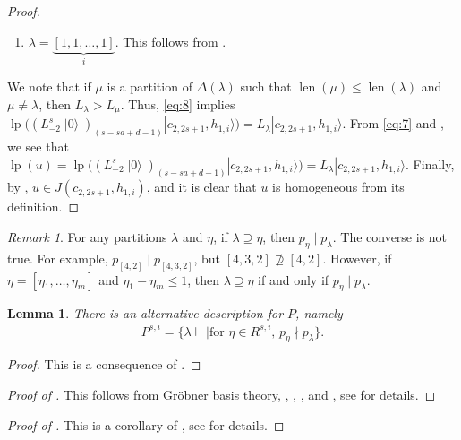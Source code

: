\documentclass[a4paper, 12pt, reqno]{amsart}
\newtheorem{lemma}[theorem]{Lemma}
\theoremstyle{remark}
\newtheorem{remark}[theorem]{Remark}
\DeclareMathOperator{\len}{len}
\DeclareMathOperator{\vac}{|0\rangle}
\DeclareMathOperator{\lp}{lp}
\begin{document}
\begin{proof}
\begin{enumerate}
\begin{description}[leftmargin = !]
      Since $\binom{s - 1}{d - 1} + \binom{s - 1}{d} = \binom{s}{d}$, we obtain \eqref{eq:8}.
    \end{description}
  \item $\lambda = \underbrace{[1, 1, \dots, 1]}_i$.
    This follows from \cite{benoit_degenerate_1988}.
  \end{enumerate}
  We note that if $\mu$ is a partition of $\Delta(\lambda)$ such that $\len(\mu) \le \len(\lambda)$ and $\mu \neq \lambda$, then $L_{\lambda} > L_{\mu}$.
  Thus, \eqref{eq:8} implies $\lp((L_{-2}^s\vac)_{(s - sa + d - 1)}|c_{2, 2s + 1}, h_{1, i}\rangle) = L_{\lambda}|c_{2, 2s + 1}, h_{1, i}\rangle$.
  From \eqref{eq:7} and , we see that $\lp(u) = \lp((L_{-2}^s\vac)_{(s - sa + d - 1)}|c_{2, 2s + 1}, h_{1, i}\rangle) = L_{\lambda}|c_{2, 2s + 1}, h_{1, i}\rangle$.
  Finally, by , $u \in J(c_{2, 2s + 1}, h_{1, i})$, and it is clear that $u$ is homogeneous from its definition.
\end{proof}

\begin{remark}
  \label{rmk:6}
  For any partitions $\lambda$ and $\eta$, if $\lambda \supseteq \eta$, then $p_{\eta} \mid p_{\lambda}$.
  The converse is not true.
  For example, $p_{[4, 2]} \mid p_{[4, 3, 2]}$, but $[4, 3, 2] \nsupseteq [4, 2]$.
  However, if $\eta = [\eta_1, \dots, \eta_m]$ and $\eta_1 - \eta_m \le 1$, then $\lambda \supseteq \eta$ if and only if $p_{\eta} \mid p_{\lambda}$.
\end{remark}

\begin{lemma}
  \label{lmm:12}
  There is an alternative description for $P$, namely
  \begin{equation*}
    P^{s, i} = \{\lambda \vdash \mid \text{for $\eta \in R^{s, i}$, $p_{\eta} \nmid p_{\lambda}$}\}.
  \end{equation*}
\end{lemma}

\begin{proof}
  This is a consequence of .
\end{proof}

\begin{proof}[Proof of ]
  This follows from Gröbner basis theory, , , ,  and , see \cite{salazar_pbw_2024} for details.
\end{proof}

\begin{proof}[Proof of ]
  This is a corollary of , see \cite{salazar_pbw_2024} for details.
\end{proof}
\end{document}
